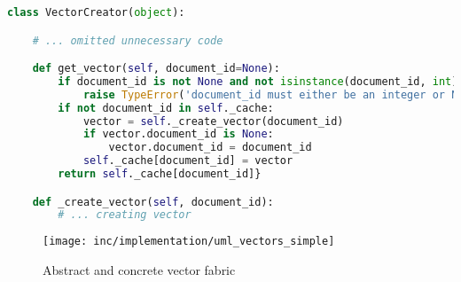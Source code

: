 \begin{lstlisting}[language=Python,caption={Dynamic programming},label={lst:dynamic-programming},float=h]
class VectorCreator(object):

    # ... omitted unnecessary code

    def get_vector(self, document_id=None):
        if document_id is not None and not isinstance(document_id, int):
            raise TypeError('document_id must either be an integer or None')
        if not document_id in self._cache:
            vector = self._create_vector(document_id)
            if vector.document_id is None:
                vector.document_id = document_id
            self._cache[document_id] = vector
        return self._cache[document_id]}

    def _create_vector(self, document_id):
        # ... creating vector
\end{lstlisting}


\begin{figure}[h]
    \center
    \texttt{[image: inc/implementation/uml\_vectors\_simple]}
    \caption{Abstract and concrete vector fabric}
    \label{fig:uml-vectorssimple}
\end{figure}
